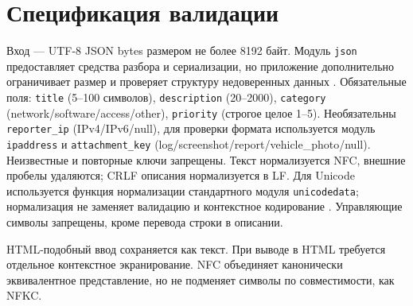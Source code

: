 \documentclass[12pt,a4paper]{article}
\begin{document}
\section{Спецификация валидации}
Вход — UTF-8 JSON bytes размером не более 8192 байт. Модуль \texttt{json} предоставляет средства разбора и сериализации, но приложение дополнительно ограничивает размер и проверяет структуру недоверенных данных \cite{python-json,owasp-input}. Обязательные поля: \texttt{title} (5–100 символов), \texttt{description} (20–2000), \texttt{category} (network/software/access/other), \texttt{priority} (строгое целое 1–5). Необязательны \texttt{reporter\_ip} (IPv4/IPv6/null), для проверки формата используется модуль \texttt{ipaddress} \cite{python-ipaddress} и \texttt{attachment\_key} (log/screenshot/report/vehicle\_photo/null). Неизвестные и повторные ключи запрещены. Текст нормализуется NFC, внешние пробелы удаляются; CRLF описания нормализуется в LF. Для Unicode используется функция нормализации стандартного модуля \texttt{unicodedata}; нормализация не заменяет валидацию и контекстное кодирование \cite{python-unicode,owasp-input}. Управляющие символы запрещены, кроме перевода строки в описании.

HTML-подобный ввод сохраняется как текст. При выводе в HTML требуется отдельное контекстное экранирование. NFC объединяет канонически эквивалентное представление, но не подменяет символы по совместимости, как NFKC.
\end{document}
